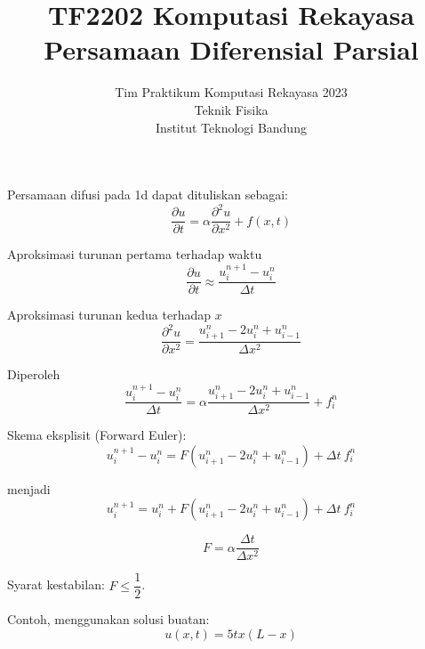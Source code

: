 



\title{%
{\small TF2202 Komputasi Rekayasa}\\
Persamaan Diferensial Parsial
}
\author{Tim Praktikum Komputasi Rekayasa 2023\\
Teknik Fisika\\
Institut Teknologi Bandung}
\date{}
\maketitle

Persamaan difusi pada 1d dapat dituliskan sebagai:
\begin{equation*}
\frac{\partial u}{\partial t} =\alpha\frac{\partial^{2}u}{\partial x^{2}}+f(x,t)
\end{equation*}

Aproksimasi turunan pertama terhadap waktu
\begin{equation*}
\frac{\partial u}{\partial t}\approx\frac{u_{i}^{n+1}-u_{i}^{n}}{\Delta t}    
\end{equation*}

Aproksimasi turunan kedua terhadap $x$
\begin{equation*}
\frac{\partial^{2}u}{\partial x^{2}}=\frac{u_{i+1}^{n}-2u_{i}^{n}+u_{i-1}^{n}}{\Delta x^{2}}
\end{equation*}

Diperoleh
\begin{equation*}
\frac{u_{i}^{n+1}-u_{i}^{n}}{\Delta t}=\alpha\frac{u_{i+1}^{n}-2u_{i}^{n}+u_{i-1}^{n}}{\Delta x^{2}}+f_{i}^{n}
\end{equation*}

Skema eksplisit (Forward Euler):
\begin{equation*}
u_{i}^{n+1}-u_{i}^{n}=F\left(u_{i+1}^{n}-2u_{i}^{n}+u_{i-1}^{n}\right)+\Delta t\ f_{i}^{n}
\end{equation*}


menjadi
\begin{equation*}
u_{i}^{n+1} = u_{i}^{n} + F\left(u_{i+1}^{n} - 2u_{i}^{n} + u_{i-1}^{n}\right)+\Delta t\ f_{i}^{n}
\end{equation*}

\begin{equation*}
F = \alpha\frac{\Delta t}{\Delta x^{2}}
\end{equation*}

Syarat kestabilan: $F\leq\dfrac{1}{2}$.

Contoh, menggunakan solusi buatan:
\begin{equation*}
u(x,t) = 5tx(L-x)    
\end{equation*}

